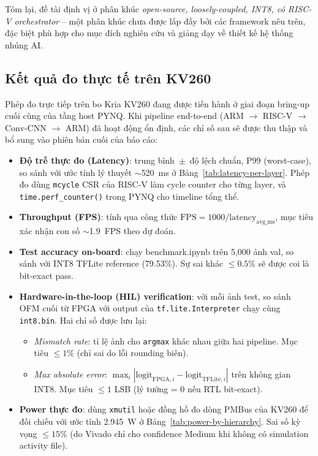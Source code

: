 Tóm lại, đề tài định vị ở phân khúc \textit{open-source, loosely-coupled, INT8, có RISC-V orchestrator} -- một phân khúc chưa được lấp đầy bởi các framework nêu trên, đặc biệt phù hợp cho mục đích nghiên cứu và giảng dạy về thiết kế hệ thống nhúng AI.

\subsection{Kết quả đo thực tế trên KV260}
\label{sec:onboard-results}

Phép đo trực tiếp trên bo Kria KV260 đang được tiến hành ở giai đoạn bring-up cuối cùng của tầng host PYNQ. Khi pipeline end-to-end (ARM $\rightarrow$ RISC-V $\rightarrow$ Conv-CNN $\rightarrow$ ARM) đã hoạt động ổn định, các chỉ số sau sẽ được thu thập và bổ sung vào phiên bản cuối của báo cáo:

\begin{itemize}
    \item \textbf{Độ trễ thực đo (Latency)}: trung bình~$\pm$~độ lệch chuẩn, P99 (worst-case), so sánh với ước tính lý thuyết $\sim$520~ms ở Bảng~\ref{tab:latency-per-layer}. Phép đo dùng \texttt{mcycle} CSR của RISC-V làm cycle counter cho từng layer, và \texttt{time.perf\_counter()} trong PYNQ cho timeline tổng thể.
    \item \textbf{Throughput (FPS)}: tính qua công thức $\text{FPS} = 1000 / \text{latency}_{\text{avg\_ms}}$, mục tiêu xác nhận con số $\sim$1.9~FPS theo dự đoán.
    \item \textbf{Test accuracy on-board}: chạy benchmark.ipynb trên 5{,}000 ảnh val, so sánh với INT8 TFLite reference (79.53\%). Sự sai khác $\leq 0.5\%$ sẽ được coi là bit-exact pass.
    \item \textbf{Hardware-in-the-loop (HIL) verification}: với mỗi ảnh test, so sánh OFM cuối từ FPGA với output của \texttt{tf.lite.Interpreter} chạy cùng \texttt{int8.bin}. Hai chỉ số được lưu lại:
        \begin{itemize}
            \item \textit{Mismatch rate}: tỉ lệ ảnh cho \texttt{argmax} khác nhau giữa hai pipeline. Mục tiêu $\leq 1\%$ (chỉ sai do lỗi rounding biên).
            \item \textit{Max absolute error}: $\max_i |\text{logit}_{\text{FPGA}, i} - \text{logit}_{\text{TFLite}, i}|$ trên không gian INT8. Mục tiêu $\leq 1$ LSB (lý tưởng = 0 nếu RTL bit-exact).
        \end{itemize}
    \item \textbf{Power thực đo}: dùng \texttt{xmutil} hoặc đồng hồ đo dòng PMBus của KV260 để đối chiếu với ước tính 2.945~W ở Bảng~\ref{tab:power-by-hierarchy}. Sai số kỳ vọng $\leq 15\%$ (do Vivado chỉ cho confidence Medium khi không có simulation activity file).
\end{itemize}

